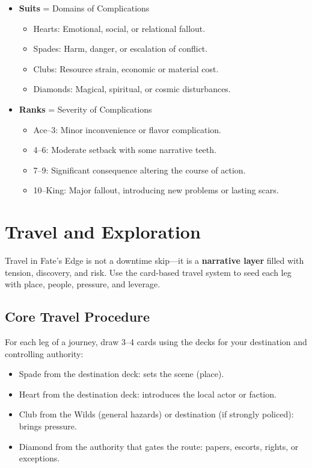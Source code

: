 \begin{itemize}
    \item \textbf{Suits} = Domains of Complications
    \begin{itemize}
        \item Hearts: Emotional, social, or relational fallout.
        \item Spades: Harm, danger, or escalation of conflict.
        \item Clubs: Resource strain, economic or material cost.
        \item Diamonds: Magical, spiritual, or cosmic disturbances.
    \end{itemize}
    \item \textbf{Ranks} = Severity of Complications
    \begin{itemize}
        \item Ace--3: Minor inconvenience or flavor complication.
        \item 4--6: Moderate setback with some narrative teeth.
        \item 7--9: Significant consequence altering the course of action.
        \item 10--King: Major fallout, introducing new problems or lasting scars.
    \end{itemize}
\end{itemize}

\section*{Travel and Exploration}

Travel in Fate's Edge is not a downtime skip---it is a \textbf{narrative layer} filled with tension, discovery, and risk. Use the card-based travel system to seed each leg with place, people, pressure, and leverage.

\subsection*{Core Travel Procedure}

For each leg of a journey, draw 3--4 cards using the decks for your destination and controlling authority:

\begin{itemize}
    \item Spade from the destination deck: sets the scene (place).
    \item Heart from the destination deck: introduces the local actor or faction.
    \item Club from the Wilds (general hazards) or destination (if strongly policed): brings pressure.
    \item Diamond from the authority that gates the route: papers, escorts, rights, or exceptions.
\end{itemize}


